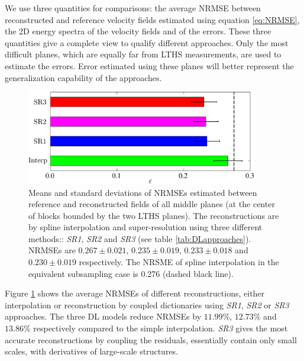 We use three quantities for comparisons: the average NRMSE between reconstructed and reference velocity fields estimated using equation \ref{eq:NRMSE}, the 2D energy spectra of the velocity fields and of the errors. These three quantities give a complete view to qualify different approaches. Only the most difficult planes, which are equally far from LTHS measurements, are used to estimate the errors. Error estimated using these planes will better represent the generalization capability of the approaches.

\begin{figure}
	\centering
	\includegraphics[width=0.9\textwidth]{./images/DL/SR_sspacing04/downsampling/NRMSE_compare_all_spacespacing_04.eps}
	\caption{Means and standard deviations of NRMSEs estimated between reference and reconstructed fields of all middle planes (at the center of blocks bounded by the two LTHS planes). The reconstructions are by spline interpolation and super-resolution using three different methods:: \textit{SR1}, \textit{SR2} and \textit{SR3} (see table \ref{tab:DLapproaches}). NRMSEs are $ 0.267 \pm 0.021 $, $ 0.235 \pm 0.019 $, $ 0.233 \pm 0.018 $ and $ 0.230 \pm 0.019 $ respectively. The NRSME of spline interpolation in the equivalent subsampling case is 0.276 (dashed black line).}
	\label{fig:NRMSE_compare_all_spacespacing_04}
\end{figure}

Figure \ref{fig:NRMSE_compare_all_spacespacing_04} shows the average NRMSEs of different reconstructions, either interpolation or reconstruction by coupled dictionaries using \textit{SR1}, \textit{SR2} or \textit{SR3} approaches. The three DL models reduce NRMSEs by $ 11.99 \% $, $ 12.73 \% $ and $ 13.86 \% $ respectively compared to the simple interpolation. \textit{SR3} gives the most accurate reconstructions by coupling the residuals, essentially contain only small scales, with derivatives of large-scale structures.

